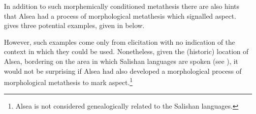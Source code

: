 In addition to such morphemically conditioned metathesis there are also hints that
Alsea had a process of morphological metathesis which signalled aspect.
\cite{bu07} gives three potential examples, given in  below.

\begin{exe}
	\label{ex:AlsMorMet}
\end{exe}

However, such examples come only from elicitation
with no indication of the context in which they could be used.
Nonetheless, given the (historic) location of Alsea,
bordering on the area in which Salishan languages are spoken (see ),
it would not be surprising if Alsea had 
also developed a morphological process of morphological metathesis to mark aspect.\footnote{
		Alsea is not considered genealogically related to the Salishan languages.}